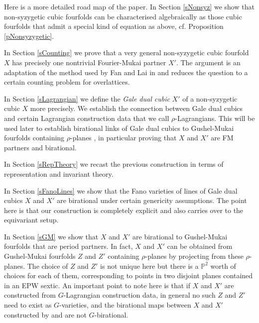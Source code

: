 \documentclass[11pt]{amsart}
\theoremstyle{plain}
\numberwithin{equation}{section}
\theoremstyle{definition}
\theoremstyle{remark}
\newcommand{\bP}{\mathbb{P}}
\newcommand{\christian}[1]{{\color{blue} \sf $\clubsuit\clubsuit\clubsuit$ Christian: [#1]}}
\newcommand{\lisa}[1]{{\color{purple} \sf $\clubsuit\clubsuit\clubsuit$ Lisa: [#1]}}
\begin{document}
Here is a more detailed road map of the paper. 
In Section \ref{sNonsyz} we show that non-syzygetic cubic fourfolds can be characterised algebraically as those cubic fourfolds that admit a special kind of equation as above, cf. Proposition  \ref{pNonsyzygetic}. 

In Section \ref{sCounting} we prove that a very general non-syzygetic cubic fourfold $X$ has precisely one nontrivial Fourier-Mukai partner $X'$. The argument is an adaptation of the method used by Fan and Lai in \cite{FanLaiCremona} and reduces the question to a certain counting problem for overlattices. 

In Section \ref{sLagrangian} we define the \emph{Gale dual cubic} $X'$ of a non-syzygetic cubic $X$ more precisely. We establish the connection between Gale dual cubics and certain Lagrangian construction data that we call $\rho$-Lagrangians. This will be used later to establish birational links of Gale dual cubics to Gushel-Mukai fourfolds containing $\rho$-planes \cite[\S 5]{KuzPerry}, in particular proving that $X$ and $X'$ are FM partners and birational. 

In Section \ref{sRepTheory} we recast the previous construction in terms of representation and invariant theory. 

In Section \ref{sFanoLines} we show that the Fano varieties of lines of Gale dual cubics $X$ and $X'$ are birational under certain genericity assumptions. The point here is that our construction is completely explicit and also carries over to the equivariant setup. %

In Section \ref{sGM} we show that $X$ and $X'$ are birational to Gushel-Mukai fourfolds that are period partners. In fact, $X$ and $X'$ can be obtained from Gushel-Mukai fourfolds $Z$ and $Z'$ containing $\rho$-planes by projecting from these $\rho$-planes. The choice of $Z$ and $Z'$ is not unique here but there is a $\bP^2$ worth of choices for each of them, corresponding to points in two disjoint planes contained in an EPW sextic. An important point to note here is that if $X$ and $X'$ are constructed from $G$-Lagrangian construction data, in general no such $Z$ and $Z'$ need to exist as $G$-varieties, and the birational maps between $X$ and $X'$ constructed by \cite{KuzPerry} and \cite{DK1} are not $G$-birational. 
\end{document}
